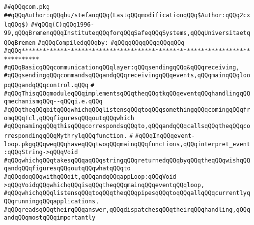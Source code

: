 \label{src/lib/tk/src/com.pkg}
\verb|##qQQqcom.pkg|\newline
\verb|##qQQqAuthor:qQQqbu/stefanqQQq(LastqQQqmodificationqQQq$Author:qQQq2cxlqQQq$)|\newline
\verb|##qQQq(C)qQQq1996-99,qQQqBremenqQQqInstituteqQQqforqQQqSafeqQQqSystems,qQQqUniversitaetqQQqBremen|\newline
\newline
\verb|#qQQqCompiledqQQqby:|\newline
\verb|#qQQqqQQqqQQqqQQqqQQq|\newline
\newline
\newline
\newline
\newline
\verb|#qQQq***************************************************************************|\newline
\verb|#qQQqBasicqQQqcommunicationqQQqlayer:qQQqsendingqQQq&qQQqreceiving,|\newline
\verb|#qQQqsendingqQQqcommandsqQQqandqQQqreceivingqQQqevents,qQQqmainqQQqloopqQQqandqQQqcontrol.qQQq|\newline
\verb|#|\newline
\verb|#qQQqThisqQQqmoduleqQQqimplementsqQQqtheqQQqtkqQQqeventqQQqhandlingqQQqmechanismqQQq--qQQqi.e.qQQq|\newline
\verb|#qQQqtheqQQqbitqQQqwhichqQQqlistensqQQqtoqQQqsomethingqQQqcomingqQQqfromqQQqTcl,qQQqfiguresqQQqoutqQQqwhich|\newline
\verb|#qQQqnamingqQQqthisqQQqcorrespondsqQQqto,qQQqandqQQqcallsqQQqtheqQQqcorrespondingqQQqMythrylqQQqfunction.|\newline
\verb|#|\newline
\verb|#qQQqInqQQqevent-loop.pkgqQQqweqQQqhaveqQQqtwoqQQqmainqQQqfunctions,qQQqinterpret_event:qQQqString->qQQqVoid|\newline
\verb|#qQQqwhichqQQqtakesqQQqaqQQqstringqQQqreturnedqQQqbyqQQqtheqQQqwishqQQqandqQQqfiguresqQQqoutqQQqwhatqQQqto|\newline
\verb|#qQQqdoqQQqwithqQQqit,qQQqandqQQqappLoop:qQQqVoid->qQQqVoidqQQqwhichqQQqisqQQqtheqQQqmainqQQqeventqQQqloop,|\newline
\verb|#qQQqwhichqQQqlistensqQQqtoqQQqtheqQQqpipesqQQqtoqQQqallqQQqcurrentlyqQQqrunningqQQqapplications,|\newline
\verb|#qQQqreadsqQQqtheirqQQqanswer,qQQqdispatchesqQQqtheirqQQqhandling,qQQqandqQQqmostqQQqimportantly|\newline

